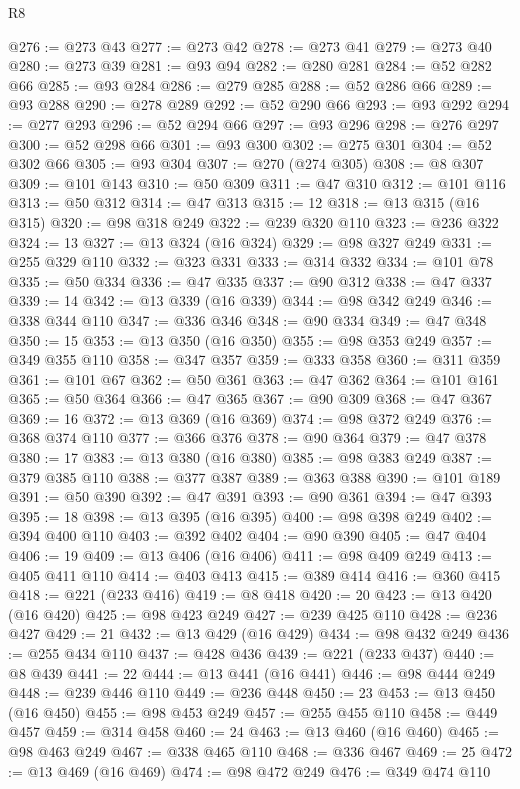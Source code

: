 \begin{lexlean}{R8}
\begin{coremodule}
@276 := @273 @43
@277 := @273 @42
@278 := @273 @41
@279 := @273 @40
@280 := @273 @39
@281 := @93 @94
@282 := @280 @281
@284 := @52 @282 @66
@285 := @93 @284
@286 := @279 @285
@288 := @52 @286 @66
@289 := @93 @288
@290 := @278 @289
@292 := @52 @290 @66
@293 := @93 @292
@294 := @277 @293
@296 := @52 @294 @66
@297 := @93 @296
@298 := @276 @297
@300 := @52 @298 @66
@301 := @93 @300
@302 := @275 @301
@304 := @52 @302 @66
@305 := @93 @304
@307 := @270 (@274 @305)
@308 := @8 @307
@309 := @101 @143
@310 := @50 @309
@311 := @47 @310
@312 := @101 @116
@313 := @50 @312
@314 := @47 @313
@315 := 12
@318 := @13 @315 (@16 @315)
@320 := @98 @318 @249
@322 := @239 @320 @110
@323 := @236 @322
@324 := 13
@327 := @13 @324 (@16 @324)
@329 := @98 @327 @249
@331 := @255 @329 @110
@332 := @323 @331
@333 := @314 @332
@334 := @101 @78
@335 := @50 @334
@336 := @47 @335
@337 := @90 @312
@338 := @47 @337
@339 := 14
@342 := @13 @339 (@16 @339)
@344 := @98 @342 @249
@346 := @338 @344 @110
@347 := @336 @346
@348 := @90 @334
@349 := @47 @348
@350 := 15
@353 := @13 @350 (@16 @350)
@355 := @98 @353 @249
@357 := @349 @355 @110
@358 := @347 @357
@359 := @333 @358
@360 := @311 @359
@361 := @101 @67
@362 := @50 @361
@363 := @47 @362
@364 := @101 @161
@365 := @50 @364
@366 := @47 @365
@367 := @90 @309
@368 := @47 @367
@369 := 16
@372 := @13 @369 (@16 @369)
@374 := @98 @372 @249
@376 := @368 @374 @110
@377 := @366 @376
@378 := @90 @364
@379 := @47 @378
@380 := 17
@383 := @13 @380 (@16 @380)
@385 := @98 @383 @249
@387 := @379 @385 @110
@388 := @377 @387
@389 := @363 @388
@390 := @101 @189
@391 := @50 @390
@392 := @47 @391
@393 := @90 @361
@394 := @47 @393
@395 := 18
@398 := @13 @395 (@16 @395)
@400 := @98 @398 @249
@402 := @394 @400 @110
@403 := @392 @402
@404 := @90 @390
@405 := @47 @404
@406 := 19
@409 := @13 @406 (@16 @406)
@411 := @98 @409 @249
@413 := @405 @411 @110
@414 := @403 @413
@415 := @389 @414
@416 := @360 @415
@418 := @221 (@233 @416)
@419 := @8 @418
@420 := 20
@423 := @13 @420 (@16 @420)
@425 := @98 @423 @249
@427 := @239 @425 @110
@428 := @236 @427
@429 := 21
@432 := @13 @429 (@16 @429)
@434 := @98 @432 @249
@436 := @255 @434 @110
@437 := @428 @436
@439 := @221 (@233 @437)
@440 := @8 @439
@441 := 22
@444 := @13 @441 (@16 @441)
@446 := @98 @444 @249
@448 := @239 @446 @110
@449 := @236 @448
@450 := 23
@453 := @13 @450 (@16 @450)
@455 := @98 @453 @249
@457 := @255 @455 @110
@458 := @449 @457
@459 := @314 @458
@460 := 24
@463 := @13 @460 (@16 @460)
@465 := @98 @463 @249
@467 := @338 @465 @110
@468 := @336 @467
@469 := 25
@472 := @13 @469 (@16 @469)
@474 := @98 @472 @249
@476 := @349 @474 @110

\end{coremodule}
\end{lexlean}
